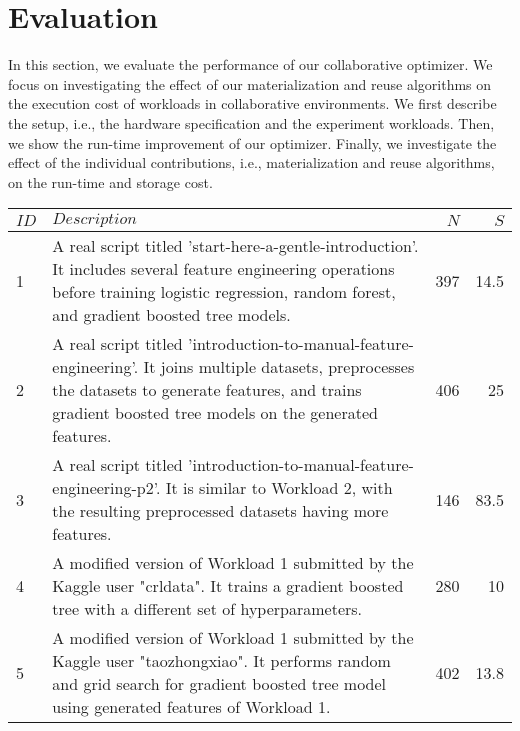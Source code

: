 \section{Evaluation} \label{sec-evaluation} 
In this section, we evaluate the performance of our collaborative optimizer.
We focus on investigating the effect of our materialization and reuse algorithms on the execution cost of workloads in collaborative environments.
We first describe the setup, i.e., the hardware specification and the experiment workloads.
Then, we show the run-time improvement of our optimizer.
Finally, we investigate the effect of the individual contributions, i.e., materialization and reuse algorithms, on the run-time and storage cost.
\begin{table*}[h]
\begin{tabular}{lp{}rr}
\hline
\textbf{$ID$} & \textbf{$Description$}& \textbf{$N$}& \textbf{$S$}   \\
\hline
1 &  \parbox[t]{0.84\textwidth}{\linespread{0.5}\selectfont \small A real script titled 'start-here-a-gentle-introduction'. It includes several feature engineering operations before training logistic regression, random forest, and gradient boosted tree models.} & 397 & 14.5\\[0.4cm]

2 &   \parbox[t]{0.84\textwidth}{\linespread{0.5}\selectfont \small A real script titled 'introduction-to-manual-feature-engineering'. It joins multiple datasets, preprocesses the datasets to generate features, and trains gradient boosted tree models on the generated features.} & 406 & 25\\[0.4cm]

3 &   \parbox[t]{0.84\textwidth}{\linespread{0.5}\selectfont \small A real script titled 'introduction-to-manual-feature-engineering-p2'. It is similar to Workload 2, with the resulting preprocessed datasets having more features.} & 146 & 83.5\\[0.15cm]

4 & \parbox[t]{0.84\textwidth}{\linespread{0.5}\selectfont \small A modified version of Workload 1 submitted by the Kaggle user "crldata". It trains a gradient boosted tree with a different set of hyperparameters.} & 280 & 10\\[0.4cm]

5 & \parbox[t]{0.84\textwidth}{\linespread{0.5}\selectfont \small A modified version of Workload 1 submitted by the Kaggle user "taozhongxiao". It performs random and grid search for gradient boosted tree model using generated features of Workload 1.} & 402 & 13.8\\[0.4cm]


\end{tabular}
\end{table*}
